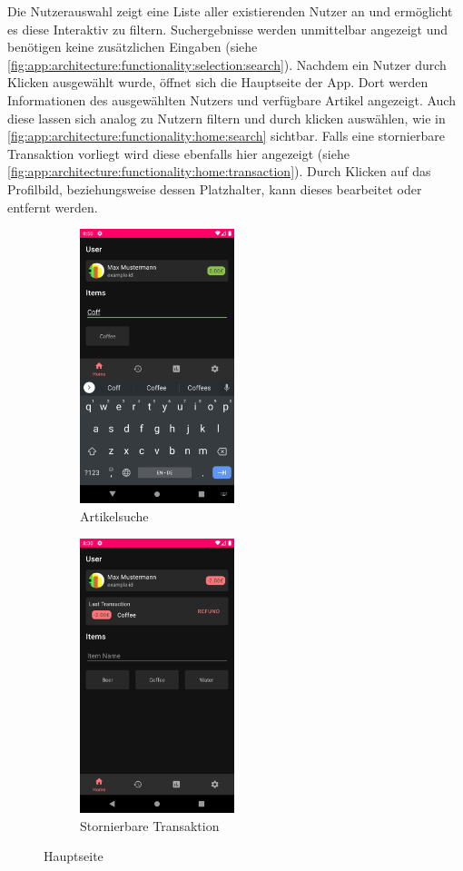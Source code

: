 \documentclass[a4paper, 11pt]{article}
\begin{document}
Die Nutzerauswahl zeigt eine Liste aller existierenden Nutzer an und ermöglicht es diese Interaktiv zu filtern.
Suchergebnisse werden unmittelbar angezeigt und benötigen keine zusätzlichen Eingaben (siehe \autoref{fig:app:architecture:functionality:selection:search}).
Nachdem ein Nutzer durch Klicken ausgewählt wurde, öffnet sich die Hauptseite der App.
Dort werden Informationen des ausgewählten Nutzers und verfügbare Artikel angezeigt.
Auch diese lassen sich analog zu Nutzern filtern und durch klicken auswählen, wie in \autoref{fig:app:architecture:functionality:home:search} sichtbar.
Falls eine stornierbare Transaktion vorliegt wird diese ebenfalls hier angezeigt (siehe \autoref{fig:app:architecture:functionality:home:transaction}).
Durch Klicken auf das Profilbild, beziehungsweise dessen Platzhalter, kann dieses bearbeitet oder entfernt werden.
\begin{figure}[]
	\begin{subfigure}{.5\textwidth}
		\centering
		\includegraphics[height=8cm,keepaspectratio]{./images/screenshots/home-fragment.png}
		\caption{Artikelsuche}
		\label{fig:app:architecture:functionality:home:search}
	\end{subfigure}
	\begin{subfigure}{.5\textwidth}
		\centering
		\includegraphics[height=8cm,keepaspectratio]{./images/screenshots/home-fragment-transaction.png}
		\caption{Stornierbare Transaktion}
		\label{fig:app:architecture:functionality:home:transaction}
	\end{subfigure}
	\caption{Hauptseite}
	\label{fig:app:architecture:functionality:home}
\end{figure}
\end{document}
